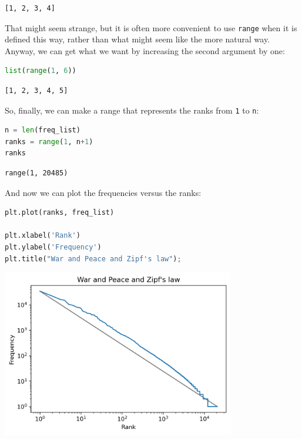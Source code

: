 \begin{lstlisting}[style=output]
[1, 2, 3, 4]
\end{lstlisting}

That might seem strange, but it is often more convenient to use
\passthrough{\lstinline!range!} when it is defined this way, rather than
what might seem like the more natural way. Anyway, we can get what we
want by increasing the second argument by one:

\begin{lstlisting}[language=Python,style=source]
list(range(1, 6))
\end{lstlisting}

\begin{lstlisting}[style=output]
[1, 2, 3, 4, 5]
\end{lstlisting}

So, finally, we can make a range that represents the ranks from
\passthrough{\lstinline!1!} to \passthrough{\lstinline!n!}:

\begin{lstlisting}[language=Python,style=source]
n = len(freq_list)
ranks = range(1, n+1)
ranks
\end{lstlisting}

\begin{lstlisting}[style=output]
range(1, 20485)
\end{lstlisting}

And now we can plot the frequencies versus the ranks:

\begin{lstlisting}[language=Python,style=source]
plt.plot(ranks, freq_list)

plt.xlabel('Rank')
plt.ylabel('Frequency')
plt.title("War and Peace and Zipf's law");
\end{lstlisting}

\begin{center}
\includegraphics[width=4in]{chapters/06_plotting_files/06_plotting_83_0.png}
\end{center}

